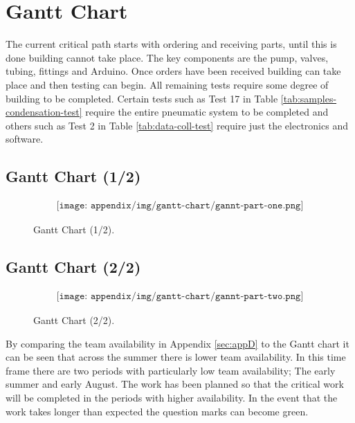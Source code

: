 \section{Gantt Chart} \label{sec:appF}
The current critical path starts with ordering and receiving parts, until this is done building cannot take place. The key components are the pump, valves, tubing, fittings and Arduino. Once orders have been received building can take place and then testing can begin. All remaining tests require some degree of building to be completed. Certain tests such as Test 17 in Table \ref{tab:samples-condensation-test} require the entire pneumatic system to be completed and others such as Test 2 in Table \ref{tab:data-coll-test} require just the electronics and software.
\subsection{Gantt Chart (1/2)}
\begin{figure}[H]
    \begin{align*}
        \texttt{[image: appendix/img/gantt-chart/gannt-part-one.png]}
    \end{align*}
    \caption{Gantt Chart (1/2).}
    \label{fig:gantt-chart-1}
\end{figure}

\subsection{Gantt Chart (2/2)}

\begin{figure}[H]
    \begin{align*}
        \texttt{[image: appendix/img/gantt-chart/gannt-part-two.png]}
    \end{align*}
    \caption{Gantt Chart (2/2).}
    \label{fig:gantt-chart-2}
\end{figure}

By comparing the team availability in Appendix \ref{sec:appD} to the Gantt chart it can be seen that across the summer there is lower team availability. In this time frame there are two periods with particularly low team availability; The early summer and early August. The work has been planned so that the critical work will be completed in the periods with higher availability. In the event that the work takes longer than expected the question marks can become green.